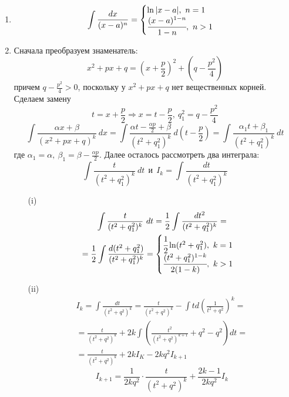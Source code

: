 \begin{enumerate}
    \item \[\int\frac{dx}{(x-a)^n}  = \begin{cases}\ln|x-a|,\ n = 1\\ \cfrac{(x-a)^{1-n}}{1-n}, \ n > 1\end{cases}\]
    \item Сначала преобразуем знаменатель:
    \[x^2+px+q=(x+\frac{p}{2})^2+(q-\frac{p^2}{4})\]
    причем $q-\frac{p^2}{4}>0$, поскольку у $x^2+px+q$ нет вещественных корней. Сделаем замену 
    \[t=x+\frac{p}{2} \Rightarrow x= t-\frac{p}{2},\ q_1^2=q-\frac{p^2}{4}\]
    \[\int\frac{\alpha x+\beta}{(x^2+px+q)^k}\ dx = \int \frac{\alpha t-\frac{\alpha p}{2}+\beta}{(t^2+q_1^2)^k}\ d(t-\frac{p}{2})=\int \frac{\alpha_1 t+\beta_1}{(t^2+q_1^2)^k}\ dt\]
    где $\alpha_1=\alpha,\ \beta_1=\beta-\frac{\alpha p}{2}$. Далее осталось рассмотреть два интеграла:
    \[\int \frac{t}{(t^2+q_1^2)^k}\ dt\ \ \text{и}\ \ I_k=\int \frac{dt}{(t^2+q_1^2)^k}\]
    \begin{itemize}
        \item[(i)] 
        \begin{multline*}
            \int\frac{t}{(t^2+q_1^2)^k}\ dt = \frac{1}{2}\int\frac{dt^2}{(t^2+q_1^2)^k} =\\
            = \frac{1}{2}\int\frac{d(t^2+q_1^2)}{(t^2+q_1^2)^k} = \begin{cases}\cfrac{1}{2}\ln(t^2+q_1^2),\ k = 1\\ \cfrac{(t^2+q_1^2)^{1-k}}{2(1-k)}, \ k > 1\end{cases}
        \end{multline*}
        \item[(ii)] 
        \begin{multline*}
            I_k=\int \frac{dt}{(t^2+q^2)^k}=\frac{t}{(t^2+q^2)^k}-\int t d(\frac{1}{t^2+q^2})^k=\\
            =\frac{t}{(t^2+q^2)^k}+2k\int \left(\frac{t^2}{(t^2+q^2)^{k+1}}+q^2-q^2\right)dt=\\
            =\frac{t}{(t^2+q^2)^k}+2kI_K-2kq^2 I_{k+1}
        \end{multline*}
        \[I_{k+1}=\frac{1}{2kq^2}\cdot \frac{t}{(t^2+q^2)^k}+\frac{2k-1}{2kq^2}I_k\]
    \end{itemize}
\end{enumerate}